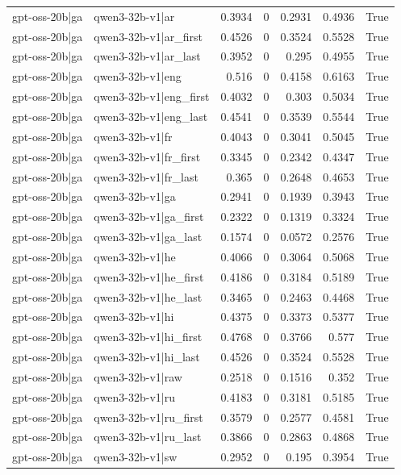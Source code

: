 \begin{table}
\begin{tabular}{l l r r r r l}
gpt-oss-20b|ga & qwen3-32b-v1|ar & 0.3934 & 0 & 0.2931 & 0.4936 & True \\
gpt-oss-20b|ga & qwen3-32b-v1|ar_first & 0.4526 & 0 & 0.3524 & 0.5528 & True \\
gpt-oss-20b|ga & qwen3-32b-v1|ar_last & 0.3952 & 0 & 0.295 & 0.4955 & True \\
gpt-oss-20b|ga & qwen3-32b-v1|eng & 0.516 & 0 & 0.4158 & 0.6163 & True \\
gpt-oss-20b|ga & qwen3-32b-v1|eng_first & 0.4032 & 0 & 0.303 & 0.5034 & True \\
gpt-oss-20b|ga & qwen3-32b-v1|eng_last & 0.4541 & 0 & 0.3539 & 0.5544 & True \\
gpt-oss-20b|ga & qwen3-32b-v1|fr & 0.4043 & 0 & 0.3041 & 0.5045 & True \\
gpt-oss-20b|ga & qwen3-32b-v1|fr_first & 0.3345 & 0 & 0.2342 & 0.4347 & True \\
gpt-oss-20b|ga & qwen3-32b-v1|fr_last & 0.365 & 0 & 0.2648 & 0.4653 & True \\
gpt-oss-20b|ga & qwen3-32b-v1|ga & 0.2941 & 0 & 0.1939 & 0.3943 & True \\
gpt-oss-20b|ga & qwen3-32b-v1|ga_first & 0.2322 & 0 & 0.1319 & 0.3324 & True \\
gpt-oss-20b|ga & qwen3-32b-v1|ga_last & 0.1574 & 0 & 0.0572 & 0.2576 & True \\
gpt-oss-20b|ga & qwen3-32b-v1|he & 0.4066 & 0 & 0.3064 & 0.5068 & True \\
gpt-oss-20b|ga & qwen3-32b-v1|he_first & 0.4186 & 0 & 0.3184 & 0.5189 & True \\
gpt-oss-20b|ga & qwen3-32b-v1|he_last & 0.3465 & 0 & 0.2463 & 0.4468 & True \\
gpt-oss-20b|ga & qwen3-32b-v1|hi & 0.4375 & 0 & 0.3373 & 0.5377 & True \\
gpt-oss-20b|ga & qwen3-32b-v1|hi_first & 0.4768 & 0 & 0.3766 & 0.577 & True \\
gpt-oss-20b|ga & qwen3-32b-v1|hi_last & 0.4526 & 0 & 0.3524 & 0.5528 & True \\
gpt-oss-20b|ga & qwen3-32b-v1|raw & 0.2518 & 0 & 0.1516 & 0.352 & True \\
gpt-oss-20b|ga & qwen3-32b-v1|ru & 0.4183 & 0 & 0.3181 & 0.5185 & True \\
gpt-oss-20b|ga & qwen3-32b-v1|ru_first & 0.3579 & 0 & 0.2577 & 0.4581 & True \\
gpt-oss-20b|ga & qwen3-32b-v1|ru_last & 0.3866 & 0 & 0.2863 & 0.4868 & True \\
gpt-oss-20b|ga & qwen3-32b-v1|sw & 0.2952 & 0 & 0.195 & 0.3954 & True \\

\end{tabular}
\end{table}

